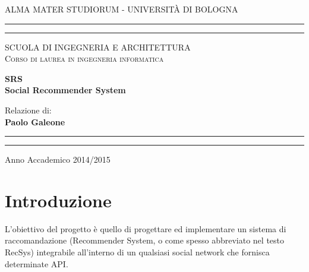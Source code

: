 \sloppy
\setlength{\parindent}{0pt}



\begin{titlepage}
    \begin{center}
        {{\large{\textsc{ALMA MATER STUDIORUM - UNIVERSITÀ DI BOLOGNA}}}}
        \rule[0.1cm]{14cm}{0.1mm}
        \rule[0.5cm]{14cm}{0.6mm}
        {\textsc { SCUOLA DI INGEGNERIA E ARCHITETTURA } }\\
        {\small{\textsc { Corso di laurea in ingegneria informatica}}}
    \end{center}
    \vspace*{\fill}
    \begin{center}
        {\Large\textbf{SRS\\[1\baselineskip]
        Social Recommender System}} \\
    \end{center}
    \vspace*{\fill}
    \par
    \noindent
    \begin{minipage}[t]{0.47\textwidth}
        {\large{Relazione di:}\\[1\baselineskip]
        {\bf Paolo Galeone}}
    \end{minipage}
    \hfill
    \vspace{20mm}
    \begin{center}
        \rule[0.1cm]{14cm}{0.1mm}
        \rule[0.5cm]{14cm}{0.6mm}
        Anno Accademico 2014/2015\\
    \end{center}
\end{titlepage}
\clearpage
\tableofcontents
\clearpage

\section{Introduzione}

L'obiettivo del progetto è quello di progettare ed implementare un sistema di raccomandazione (Recommender System, o come spesso abbreviato nel testo RecSys) integrabile all'interno di un qualsiasi social network che fornisca determinate API.

